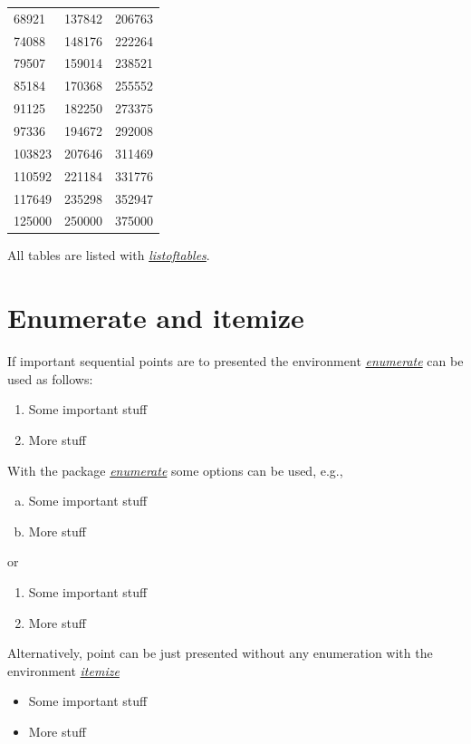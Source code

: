 \documentclass[a4paper,11pt,oneside]{book}
\newcommand{\imp}[1]{\underline{\textit{#1}}}
\begin{document}
\begin{center}
\begin{longtable}{l|l|l}
		68921 & 137842 & 206763 \\
		74088 & 148176 & 222264 \\
		79507 & 159014 & 238521 \\
		85184 & 170368 & 255552 \\
		91125 & 182250 & 273375 \\
		97336 & 194672 & 292008 \\
		103823 & 207646 & 311469 \\
		110592 & 221184 & 331776 \\
		117649 & 235298 & 352947 \\
		125000 & 250000 & 375000 \\
	\end{longtable}
\end{center}

All tables are listed with \imp{listoftables}.


\section{Enumerate and itemize}

If important sequential points are to presented the environment \imp{enumerate} can be used as follows:
\begin{enumerate}
	\item
	Some important stuff
	\item
	More stuff
\end{enumerate}
With the package \imp{enumerate} some options can be used, e.g.,
\begin{enumerate}[a)]
	\item
	Some important stuff
	\item
	More stuff
\end{enumerate}
or 
\begin{enumerate}[~~~1)]
	\item
	Some important stuff
	\item
	More stuff
\end{enumerate}

Alternatively, point can be just presented without any enumeration with the environment \imp{itemize}
\begin{itemize}
	\item
	Some important stuff
	\item
	More stuff
\end{itemize}
\end{document}
